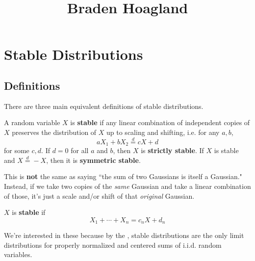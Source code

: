 \documentclass[twoside,10pt]{report}
\begin{document}
\title{Braden Hoagland}{}
\tableofcontents




\chapter{Stable Distributions}

\section{Definitions}

There are three main equivalent definitions of stable distributions.

\begin{defn}[]
A random variable $X$ is \textbf{stable} if any linear combination of independent copies of $X$ preserves the distribution of $X$ up to scaling and shifting, i.e. for any $a,b$,
\[
a X_1 + b X_2 \stackrel{d}{=} c X + d
\] for some $c,d$. If $d=0$ for all $a$ and $b$, then $X$ is \textbf{strictly stable}. If $X$ is stable and $X \stackrel{d}{=} -X$, then it is \textbf{symmetric stable}.
\end{defn}

\begin{note}[]
This is \textbf{not} the same as saying ``the sum of two Gaussians is itself a Gaussian." Instead, if we take two copies of the \emph{same} Gaussian and take a linear combination of those, it's just a scale and/or shift of that \emph{original} Gaussian.
\end{note}

\begin{defn}[]
$X$ is \textbf{stable} if
\[
X_1 + \cdots + X_{n} = c_{n}X + d_{n}
\] 

\end{defn}

We're interested in these because by the , stable distributions are the only limit distributions for properly normalized and centered sums of i.i.d. random variables.


\end{document}
